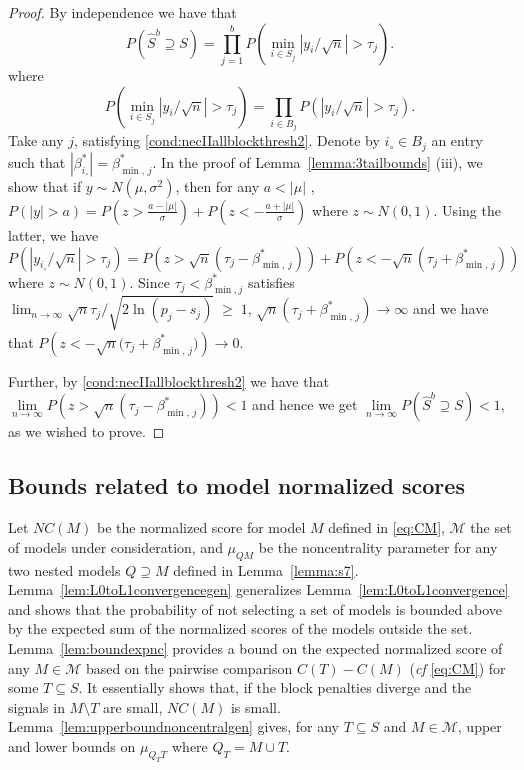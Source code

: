 \documentclass[bj,authoryear]{imsart}
\theoremstyle{plain}
\newcommand{\M}{\mathcal{M}}
\begin{document}
\begin{proof}
By independence we have that
$$P(\hat{S}^{b}\supseteq S)=\prod_{j=1}^b P(\min_{i \in S_j}|y_i/\sqrt{n}| > \tau_j).$$ 
where
$$
P(\min_{i \in S_j}|y_i/\sqrt{n}| > \tau_j)=\prod_{i \in B_j} P(|y_i/\sqrt{n}| > \tau_j). 
$$
Take any $j$, satisfying \eqref{cond:necIIallblockthresh2}. 
Denote by $i_{\circ}\in B_j$ an entry such that $|\beta_{i_{\circ}}^*|=\beta^*_{\min,\,j}$. In the proof of Lemma~\ref{lemma:3tailbounds} (iii), we show that if $y\sim N(\mu, \sigma^2)$, then for any $a<|\mu|$ , $P(|y|>a)  = P(z>\frac{a-|\mu|}{\sigma}) + P(z<-\frac{a+|\mu|}{\sigma})$ where $z\sim N(0,1)$. Using the latter, we have
$$P(|y_{i_{\circ}}/\sqrt{n}|>\tau_j) 
    = P\left(z>\sqrt{n}\left(\tau_j-\beta_{\min,\,j}^*\right)\right) + P\left(z<-\sqrt{n}\left(\tau_j+\beta_{\min,\,j}^*\right)\right)$$ where $z\sim N(0,1)$. Since $\tau_j<\beta^*_{\min,j}$ satisfies $\lim_{n\to \infty} \sqrt{n}\tau_j/\sqrt{2\ln(p_j-s_j)}\;\geq\;1$, $\sqrt{n}\left(\tau_j+\beta_{\min,\,j}^*\right)\to\infty$ and we have that $P(z<-\sqrt{n}\big(\tau_j+\beta_{\min,\,j}^*\big)) \to 0$.
    
    Further, by \eqref{cond:necIIallblockthresh2}  we have that $\underset{n \to \infty}{\lim}P\left(z>\sqrt{n}\left(\tau_j-\beta_{\min,\,j}^*\right)\right)<1$ and hence we get $\underset{n \to \infty}{\lim}P\left(\hat{S}^{b} \supseteq S \right)<1$, as we wished to prove.
\end{proof}

\subsection{Bounds related to model normalized scores}

Let $NC(M)$ be the normalized score for model $M$ defined in \eqref{eq:CM}, $\M$ the set of models under consideration, and $\mu_{Q M}$ be the noncentrality parameter for any two nested models $Q \supseteq M$ defined in Lemma~\ref{lemma:s7}. Lemma~\ref{lem:L0toL1convergencegen} generalizes Lemma~\ref{lem:L0toL1convergence} and shows that the probability of not selecting a set of models is bounded above by the expected sum of the normalized scores of the models outside the set. Lemma~\ref{lem:boundexpnc} provides a bound on the expected normalized score of any $M \in \M$ based on the pairwise comparison $C(T)-C(M)$ (\emph{cf} \eqref{eq:CM}) for some $T\subseteq S$. It essentially shows that, if the block penalties diverge and the signals in $M\setminus T$ are small, $NC(M)$ is small.  Lemma~\ref{lem:upperboundnoncentralgen} gives, for any $T\subseteq S$ and $M\in \M$, upper and lower bounds on $\mu_{Q_TT}$ where $Q_T=M\cup T$.
\end{document}
